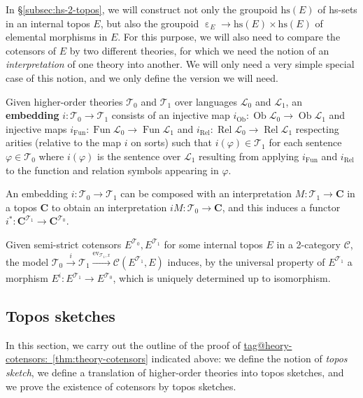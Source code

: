 \documentclass{amsart}
\makeatletter
\newcommand\bC{\mathbf{C}}
\newcommand\cC{\mathcal{C}}
\newcommand\cL{\mathcal{L}}
\newcommand\cT{\mathcal{T}}
\newcommand\defword[1]{{\boldmath \textbf{#1}}}
\newcommand\ein{\mathrel{\varepsilon}}
\newcommand\ev{\mathrm{ev}}
\newcommand\Fun{\operatorname{Fun}}
\newcommand\hs{\mathrm{hs}}
\newcommand\Ob{\operatorname{Ob}}
\renewcommand\phi{\varphi}
\newcommand\Rel{\operatorname{Rel}}
\newcommand\tox[2][]{\xrightarrow[#1]{#2}}
\newcommand\unein{{\ein}}
\newcommand\tagword[1]{\csname tag@#1\endcsname}
\def\label@tag#1:#2\@nil{#1}
\newcommand\labeltag[1]{\label@tag#1:\@nil}
\newcommand\jref[1]{%
  \texorpdfstring%
    {\hyperref[#1]{\tagword{\labeltag{#1}}~\ref*{#1}}}%
    {\tagword{\labeltag{#1}}~\ref*{#1}}%
}
\theoremstyle{definition}
\theoremstyle{remark}
\theoremstyle{plainwithref}
\makeatother
\begin{document}
In \S\ref{subsec:hs-2-topos}, we will construct not only the groupoid \( \hs(E) \) of hs-sets in an internal topos \( E \), but also the groupoid \( \unein_E \to \hs(E) \times \hs(E) \) of elemental morphisms in \( E \).
For this purpose, we will also need to compare the cotensors of \( E \) by two different theories, for which we need the notion of an \emph{interpretation} of one theory into another.
We will only need a very simple special case of this notion, and we only define the version we will need.
\begin{defn} \label{defn:thy-embedding}
  Given higher-order theories \( \cT_0 \) and \( \cT_1 \) over languages \( \cL_0 \) and \( \cL_1 \), an \defword{embedding} \( i \colon \cT_0 \to \cT_1 \) consists of an injective map \( i_{\Ob} \colon \Ob \cL_0 \to \Ob \cL_1 \) and injective maps \( i_{\Fun} \colon \Fun \cL_0 \to \Fun \cL_1 \) and \( i_{\Rel} \colon \Rel \cL_0 \to \Rel \cL_1 \) respecting arities (relative to the map \( i \) on sorts) such that \( i(\phi) \in \cT_1 \) for each sentence \( \phi \in \cT_0 \) where \( i(\phi) \) is the sentence over \( \cL_1 \) resulting from applying \( i_{\Fun} \) and \( i_{\Rel} \) to the function and relation symbols appearing in \( \phi \).

An embedding \( i \colon \cT_0 \to \cT_1 \) can be composed with an interpretation \( M \colon \cT_1 \to \bC \) in a topos \( \bC \) to obtain an interpretation \( i M \colon \cT_0 \to \bC \), and this induces a functor \( i^* \colon \bC^{\cT_1} \to \bC^{\cT_0} \).

Given semi-strict cotensors \( E^{\cT_0},E^{\cT_1} \) for some internal topos \( E \) in a 2-category \( \cC \), the model \( \cT_0 \tox{i} \cT_1 \tox{\ev_{\cT_1,x}} \cC(E^{\cT_1},E) \) induces, by the universal property of \( E^{\cT_1} \) a morphism \( E^i \colon E^{\cT_1} \to E^{\cT_0} \), which is uniquely determined up to isomorphism.
\end{defn}

\subsection{Topos sketches} \label{subsec:topos-sketches}
In this section, we carry out the outline of the proof of \jref{thm:theory-cotensors} indicated above: we define the notion of \emph{topos sketch}, we define a translation of higher-order theories into topos sketches, and we prove the existence of cotensors by topos sketches.
\end{document}
